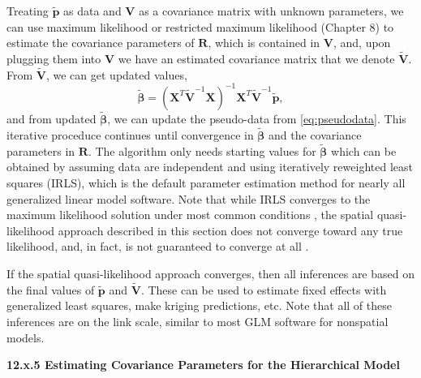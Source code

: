 \documentclass[12pt, titlepage]{article}
\begin{document}
Treating $\tilde{\mathbf{p}}$ as data and $\mathbf{V}$ as a covariance matrix with unknown parameters, we can use maximum likelihood or restricted maximum likelihood (Chapter 8) to estimate the covariance parameters of $\mathbf{R}$, which is contained in $\mathbf{V}$, and, upon plugging them into $\mathbf{V}$ we have an estimated covariance matrix that we denote $\tilde{\mathbf{V}}$.  From $\tilde{\mathbf{V}}$, we can get updated values,
$$
\tilde{\boldsymbol{\beta}} = (\mathbf{X}^{T}\tilde{\mathbf{V}}^{-1}\mathbf{X})^{-1}\mathbf{X}^{T}\tilde{\mathbf{V}}^{-1}\tilde{\mathbf{p}},
$$
and from updated $\tilde{\boldsymbol{\beta}}$, we can update the pseudo-data from \eqref{eq:pseudodata}.  This iterative proceduce continues until convergence in $\tilde{\boldsymbol{\beta}}$ and the covariance parameters in $\mathbf{R}$.  The algorithm only needs starting values for $\tilde{\boldsymbol{\beta}}$ which can be obtained by assuming data are independent and using iteratively reweighted least squares (IRLS), which is the default parameter estimation method for nearly all generalized linear model software.  Note that while IRLS converges to the maximum likelihood solution under most common conditions \citep{green_iteratively_1984}, the spatial quasi-likelihood approach described in this section does not converge toward any true likelihood, and, in fact, is not guaranteed to converge at all \citep{boykin_generalized_2010, kleinschmidt_use_2001,li_adjusting_2016}.

If the spatial quasi-likelihood approach converges, then all inferences are based on the final values of $\tilde{\mathbf{p}}$ and $\tilde{\mathbf{V}}$.  These can be used to estimate fixed effects with generalized least squares, make kriging predictions, etc.  Note that all of these inferences are on the link scale, similar to most GLM software for nonspatial models.


\vspace{.5cm}
{\large \flushleft \textbf{12.x.5 Estimating Covariance Parameters for the Hierarchical Model}}
\vspace{.5cm}
\end{document}
